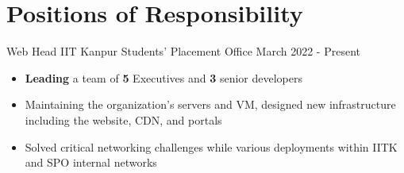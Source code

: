 \section*{\sc Positions of Responsibility}
\vspace{-2mm}
\hrulefill
\vspace{1mm}

\cventry
{Web Head} %
{IIT Kanpur} %
{Students' Placement Office} %
{March 2022 - Present} %
{
  \begin{itemize} %
    \item \textbf{Leading} a team of \textbf{5} Executives and \textbf{3} senior developers
    \item Maintaining the organization’s servers and VM, designed new infrastructure including the website, CDN, and portals
    \item Solved critical networking challenges while various deployments within IITK and SPO internal networks
  \end{itemize}
}

